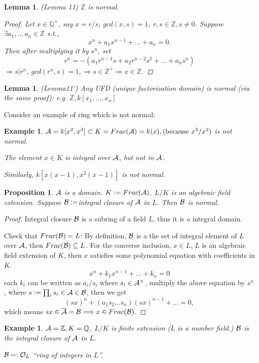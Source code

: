 \documentclass[11pt]{article}
\newtheorem{prop}[thm]{Proposition}
\newtheorem{lemma}[thm]{Lemma}
\newtheorem{ex}[thm]{Example}
\newcommand{\intg}{\mathbb Z}
\newcommand{\ratl}{\mathbb Q}
\newcommand{\cala}{{\cal A}}
\newcommand{\calb}{{\cal B}}
\newcommand{\calo}{{\cal O}}
\newcommand{\Lrta}{\Longrightarrow}
\begin{document}
\begin{lemma}\label{lem:integral_lemma11}(Lemma 11)
$\intg$ is normal.
\begin{proof}
Let $x\in \ratl^\times$, say $x=r/s$, $gcd(x,s)=1$, $r,s\in\intg, s\neq 0$. Suppose $\exists a_1,..,a_n\in\intg$ s.t.,
$$
x^n+a_1 x^{n-1}+...+a_n=0.
$$
Then after multiplying it by $s^n$, set
$$
r^n=-(a_1 r^{n-1}s+a_2 r^{n-2}s^2+...+a_n s^n)
$$
$\Lrta s|r^n$, $gcd(r^n,s)=1,\Lrta s\in \intg^\times\Lrta x\in \intg$.
\end{proof}
\end{lemma}

\begin{lemma}\label{lem:integral_lemma11'}(Lemma11')
Any UFD (unique factorization domain) is normal (via the same proof): e.g. $\intg,k[x_1,...,x_n]$
\end{lemma}

Consider an example of ring which is not normal:
\begin{ex}
$\cala=k[x^2,x^3]\subset K=Frac(\cala)=k(x),(\text{because } x^3/x^2)$ is not normal.

The element $x\in K$ is integral over $\cala$, but not in $\cala$.

Similarly, $k[x(x-1),x^2(x-1)]$ is not normal.
\end{ex}
\begin{prop}\label{prop:integral_closure_in_algebraic_field_extension}
$\cala$ is a domain. $K:=Frac(\cala)$. $L/K$ is an algebraic field extension. Suppose $\calb:=$integral closure of $\cala$ in $L$. Then $\calb$ is normal.
\end{prop}
\begin{proof}
Integral closure $\calb$ is a subring of a field $L$, thus it is a integral domain.

Check that $Frac(\calb)=L$: By definition, $\calb$ is a the set of integral element of $L$ over $\cala$, then $Frac(\calb)\subseteq L$. For the converse inclusion, $x\in L$, $L$ is an algebraic field extension of $K$, then $x$ satisfies some  polynomial equation with coefficients in $K$.
$$
x^n+k_1 x^{n-1}+...+k_n=0
$$
each $k_i$ can be written as $a_i/s_i$ where $s_i\in \cala^\times $, multiply the above equation by $s^n$, where $s:=\prod_i s_i\in \cala\in\calb$,
then we get
$$
(s x)^n+(a_1s_2...s_n) (s x)^{n-1}+...=0,
$$
which means $sx\in\overline{\cala}= \calb\Lrta x\in Frac(\calb)$.
\end{proof}
\begin{ex}
$\cala=\intg, K=\ratl$, $L/K$ is finite extension ($L$ is a number field.) $\calb$ is the integral closure of $\cala$ in $L$.

$\calb=:\calo_L$ ``ring of integers in $L$''.
\end{ex}
\end{document}
